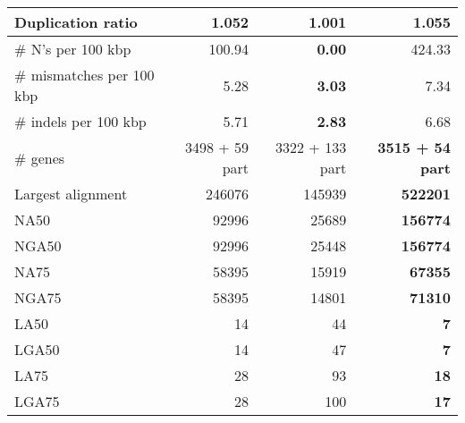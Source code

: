 \documentclass[12pt,a4paper]{article}
\begin{document}
\begin{table}[ht]
\begin{center}
\begin{tabular}{|l*{3}{|r}|}
Duplication ratio & 1.052 & {\bf 1.001} & 1.055 \\ \hline
\# N's per 100 kbp & 100.94 & {\bf 0.00} & 424.33 \\ \hline
\# mismatches per 100 kbp & 5.28 & {\bf 3.03} & 7.34 \\ \hline
\# indels per 100 kbp & 5.71 & {\bf 2.83} & 6.68 \\ \hline
\# genes & 3498 + 59 part & 3322 + 133 part & {\bf 3515 + 54 part} \\ \hline
Largest alignment & 246076 & 145939 & {\bf 522201} \\ \hline
NA50 & 92996 & 25689 & {\bf 156774} \\ \hline
NGA50 & 92996 & 25448 & {\bf 156774} \\ \hline
NA75 & 58395 & 15919 & {\bf 67355} \\ \hline
NGA75 & 58395 & 14801 & {\bf 71310} \\ \hline
LA50 & 14 & 44 & {\bf 7} \\ \hline
LGA50 & 14 & 47 & {\bf 7} \\ \hline
LA75 & 28 & 93 & {\bf 18} \\ \hline
LGA75 & 28 & 100 & {\bf 17} \\ \hline
\end{tabular}
\end{center}
\end{table}
\end{document}
